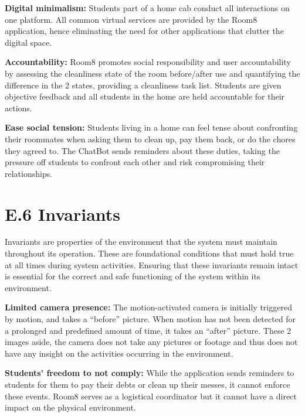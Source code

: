 \documentclass{scrreprt}
\newcommand*{\nsection}[1]{
    \section*{#1}
    \addcontentsline{toc}{section}{#1}
}
\theoremstyle{definition}
\begin{document}
\begin{flushleft}
  \item \textbf{Digital minimalism:} Students part of a home cab conduct all interactions on one platform. All common virtual services are provided by the Room8 application, hence eliminating the need for other applications that clutter the digital space.\newline

  \item \textbf{Accountability:} Room8 promotes social responsibility and user accountability by assessing the cleanliness state of the room before/after use and quantifying the difference in the 2 states, providing a cleanliness task list. Students are given objective feedback and all students in the home are held accountable for their actions.\newline
  
  \item \textbf{Ease social tension:} Students living in a home can feel tense about confronting their roommates when asking them to clean up, pay them back, or do the chores they agreed to. The ChatBot sends reminders about these duties, taking the pressure off students to confront each other and risk compromising their relationships.\newline 
\end{flushleft}

\nsection{E.6 Invariants}
Invariants are properties of the environment that the system must maintain throughout its operation. These are foundational conditions that must hold true at all times during system activities. Ensuring that these invariants remain intact is essential for the correct and safe functioning of the system within its environment.
\begin{flushleft}
  \item \textbf{Limited camera presence:} The motion-activated camera is initially triggered by motion, and takes a “before” picture. When motion has not been detected for a prolonged and predefined amount of time, it takes an “after” picture. These 2 images aside, the camera does not take any pictures or footage and thus does not have any insight on the activities occurring in the environment.  
  \newline
  \item \textbf{Students' freedom to not comply:} While the application sends reminders to students for them to pay their debts or clean up their messes, it cannot enforce these events. Room8 serves as a logistical coordinator but it cannot have a direct impact on the physical environment.
  \newline
\end{flushleft}
\end{document}

